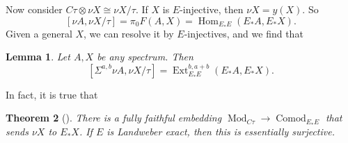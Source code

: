 \documentclass{shortart}
\newtheorem{thm}{Theorem}[section]
\newtheorem{lemma}[thm]{Lemma}
\theoremstyle{definition}
\DeclareMathOperator\Hom{Hom}
\begin{document}
Now consider $C\tau \otimes \nu X \cong \nu X / \tau$. If $X$ is $E$-injective, then $\nu X = y(X)$. So
\[
  [\nu A, \nu X / \tau] = \pi_0 F(A, X) = \Hom_{E_*E}(E_*A, E_* X).
\]
Given a general $X$, we can resolve it by $E$-injectives, and we find that
\begin{lemma}
  Let $A, X$ be any spectrum. Then
  \[
    [\Sigma^{a, b} \nu A, \nu X / \tau] = \operatorname{Ext}_{E_*E}^{b, a + b}(E_*A, E_*X).
  \]
\end{lemma}

In fact, it is true that
\begin{thm}[{\cite[Theorem 4.46, Proposition 4.53]{synthetic}}]
  There is a fully faithful embedding $\operatorname{Mod}_{C\tau} \to \operatorname{Comod}_{E_*E}$ that sends $\nu X$ to $E_* X$. If $E$ is Landweber exact, then this is essentially surjective.
\end{thm}


\end{document}
